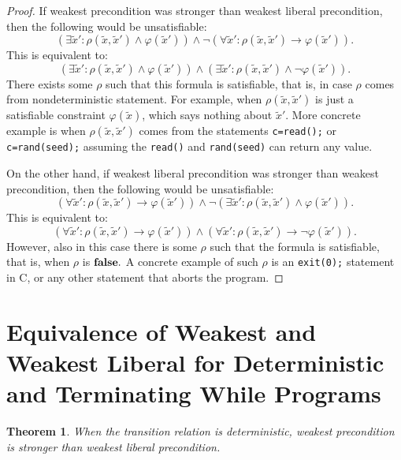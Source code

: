 \documentclass[times]{elsarticle}
\newtheorem{theorem}{Theorem}
\newcommand{\pfalse}{\mbox{\textbf{false}}}
\begin{document}
\begin{proof}
If weakest precondition was stronger than weakest liberal
precondition, then the following would be unsatisfiable: 
\[
(\exists \tilde{x}' : \rho(\tilde{x},\tilde{x}') \wedge \varphi(\tilde{x}')) \wedge \neg(\forall \tilde{x}' :
\rho(\tilde{x},\tilde{x}') \rightarrow \varphi(\tilde{x}')). 
\]
This is equivalent to:
\[
(\exists \tilde{x}' : \rho(\tilde{x},\tilde{x}') \wedge \varphi(\tilde{x}')) \wedge (\exists \tilde{x}' : \rho(\tilde{x},\tilde{x}') \wedge \neg\varphi(\tilde{x}')).
\]
There exists some $\rho$ such that this formula is satisfiable, that is,
in case $\rho$ comes from nondeterministic statement. For example, when
$\rho(\tilde{x},\tilde{x}')$ is just a satisfiable constraint $\varphi(\tilde{x})$, which says nothing
about $\tilde{x}'$. More concrete example is when $\rho(\tilde{x},\tilde{x}')$ comes from the
statements \texttt{c=read();} or \texttt{c=rand(seed);} assuming the
\texttt{read()} and \texttt{rand(seed)} can return any value.

On the other hand, if weakest liberal precondition was stronger than
weakest precondition, then the following would be unsatisfiable:
\[
(\forall \tilde{x}' : \rho(\tilde{x},\tilde{x}') \rightarrow \varphi(\tilde{x}')) \wedge \neg(\exists
\tilde{x}' : \rho(\tilde{x},\tilde{x}') \wedge \varphi(\tilde{x}')). 
\]
This is equivalent to:
\[
(\forall \tilde{x}' : \rho(\tilde{x},\tilde{x}') \rightarrow \varphi(\tilde{x}')) \wedge (\forall \tilde{x}' : \rho(\tilde{x},\tilde{x}') \rightarrow \neg\varphi(\tilde{x}')). 
\]
However, also in this case there is some $\rho$ such that the formula is
satisfiable, that is, when $\rho$ is $\pfalse.$ A concrete example
of such $\rho$ is an \texttt{exit(0);} statement in C, or any other
statement that aborts the program.
\end{proof}

\section{Equivalence of Weakest and Weakest Liberal 
for Deterministic and Terminating While Programs}
\label{sec:equivalence}


\begin{theorem} \label{theorem:wpstronger}
  When the transition relation is deterministic, weakest precondition 
  is stronger than weakest liberal precondition.
\end{theorem}
\end{document}
